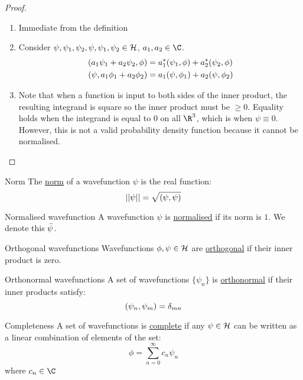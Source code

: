 \documentclass[../Main.tex]{subfiles}
\begin{document}
\begin{proof}
    \begin{enumerate}
        \item Immediate from the definition
        \item Consider $\psi, \psi_1, \psi_2, \psi, \psi_1, \psi_2 \in \mathcal{H}$, $a_1, a_2 \in \C$.
            \begin{align*}
                (a_1 \psi_1 + a_2 \psi_2,\phi) &= a_1^* (\psi_1,\phi) + a_2^* (\psi_2,\phi) \\
                (\psi,a_1 \phi_1 + a_2 \phi_2) &= a_1 (\psi,\phi_1) + a_2 (\psi,\phi_2)
            \end{align*}
        \item Note that when a function is input to both sides of the inner product, the resulting integrand is square so the inner product must be $\geq 0$. Equality holds when the integrand is equal to $0$ on all $\R^3$, which is when $\psi \equiv 0$. However, this is not a valid probability density function because it cannot be normalised.
    \end{enumerate}
\end{proof}
\begin{definition}{Norm}
    The \underline{norm} of a wavefunction $\psi$ is the real function:
    \begin{equation}
        ||\psi|| = \sqrt{(\psi,\psi)}
        \label{eqnWFNorm}
    \end{equation}
\end{definition}
\begin{definition}{Normalised wavefunction}
    A wavefunction $\psi$ is \underline{normalised} if its norm is $1$. We denote this $\bar{\psi}$.
\end{definition}
\begin{definition}{Orthogonal wavefunctions}
    Wavefunctions $\phi, \psi \in \mathcal{H}$ are  \underline{orthogonal} if their inner product is zero.
\end{definition}
\begin{definition}{Orthonormal wavefunctions}
    A set of wavefunctions $\{\psi_n\}$ is  \underline{orthonormal} if their inner products satisfy:
    \begin{equation*}
        (\psi_n,\psi_m) = \delta_{mn}
    \end{equation*}
\end{definition}
\begin{definition}{Completeness}
    A set of wavefunctions is \underline{complete} if any $\psi \in \mathcal{H}$ can be written as a linear combination of elements of the set:
    \begin{equation}
        \phi = \sum_{n = 0}^{\infty} c_n \psi_n
        \label{eqnHilbLinCombo}
    \end{equation}
    where $c_n \in \C$
\end{definition}
\end{document}
